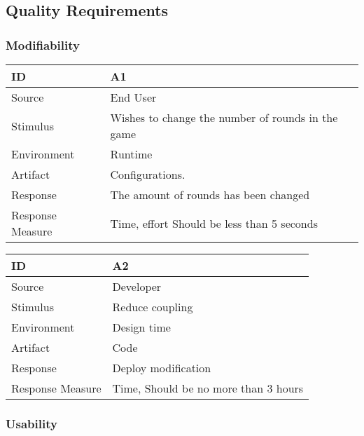 \subsection{Quality Requirements}

\subsubsection{Modifiability}

\begin{center}
    \begin{tabular}{ | l | p{12cm} |}
    \hline
	\textbf{ID} & \textbf{A1} \\ \hline
	Source & End User\\ \hline 
	Stimulus & Wishes to change the number of rounds in the game \\ \hline 
	Environment & Runtime\\ \hline 
	Artifact & Configurations. \\ \hline 
	Response & The amount of rounds has been changed\\ \hline 
	Response Measure & Time, effort Should be less than 5 seconds\\ \hline 

    \hline
    \end{tabular}
\end{center}

\begin{center}
    \begin{tabular}{ | l | p{12cm} |}
    \hline
	\textbf{ID} & \textbf{A2} \\ \hline
	Source & Developer\\ \hline 
	Stimulus & Reduce coupling  \\ \hline 
	Environment & Design time\\ \hline 
	Artifact & Code \\ \hline 
	Response & Deploy modification\\ \hline 
	Response Measure & Time, Should be no more than 3 hours\\ \hline 

    \hline
    \end{tabular}
\end{center}

\subsubsection{Usability}


